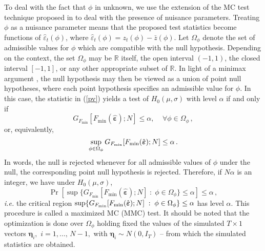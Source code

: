 \documentclass[11pt]{article}
\begin{document}
To deal with the fact that $\phi $ in unknown, we use the extension of the
MC test technique proposed in \citet{Dufour:2006} to deal with the presence
of nuisance parameters. Treating $\phi $ as a nuisance parameter means that
the proposed test statistics become functions of $\hat{\varepsilon}_{t}(\phi
)$, where $\hat{\varepsilon}_{t}(\phi )=z_{t}(\phi )-\bar{z}(\phi )$. Let $%
\Omega _{\phi }$ denote the set of admissible values for $\phi $ which are
compatible with the null hypothesis. Depending on the context, the set $%
\Omega _{\phi }$ may be $\mathbb{R}$ itself, the open interval $(-1,1)$, the
closed interval $[-1,1]$, or any other appropriate subset of $\mathbb{R}$.
In light of a minimax argument \citep{Savin:1984}, the null hypothesis may
then be viewed as a union of point null hypotheses, where each point
hypothesis specifies an admissible value for $\phi $. In this case, the
statistic in (\ref{pv}) yields a test of $H_{0}(\mu ,\sigma )$ with level $%
\alpha $ if and only if 
\begin{equation*}
G_{F_{\min }}[F_{\min }(\hat{\boldsymbol{\varepsilon }});N]\leq \alpha
,\;\;\;\;\forall \phi \in \Omega _{\phi }\,,
\end{equation*}%
or, equivalently, 
\begin{equation*}
\sup_{\phi \in \Omega _{\phi }}G_{F_{\min }}[F_{\min }(\hat{\boldsymbol{%
\varepsilon }});N]\leq \alpha \,.
\end{equation*}%
In words, the null is rejected whenever for all admissible values of $\phi $
under the null, the corresponding point null hypothesis is rejected.
Therefore, if $N\alpha $ is an integer, we have under $H_{0}(\mu ,\sigma )$, 
\begin{equation*}
\Pr \left[ \sup \big\{G_{F_{\min }}[F_{\min }(\hat{\boldsymbol{\varepsilon }}%
);N]\;:\;\phi \in \Omega _{\phi }\big\}\leq \alpha \right] \leq \alpha \,,
\end{equation*}%
\emph{i.e.} the critical region $\sup \{G_{F_{\min }}[F_{\min }(\hat{%
\boldsymbol{\varepsilon }});N]\;:\;\phi \in \Omega _{\phi }\}\leq \alpha $
has level $\alpha $. This procedure is called a maximized MC (MMC) test. It
should be noted that the optimization is done over $\Omega _{\phi }$ holding
fixed the values of the simulated $T\times 1$ vectors $\boldsymbol{\eta }%
_{i},$ $i=1,\ldots ,\,N-1,$ with $\boldsymbol{\eta }_{i}\sim N(0,I_{T})$ --
from which the simulated statistics are obtained.
\end{document}
